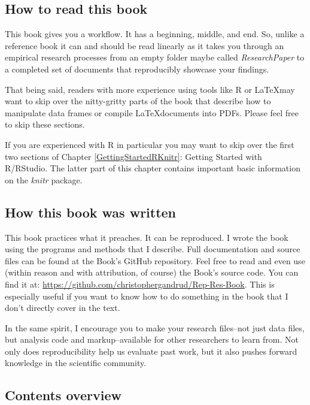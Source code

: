 \subsection{How to read this book}

This book gives you a workflow. It has a beginning, middle, and end. So, unlike a reference book it can and should be read linearly as it takes you through an empirical research processes from an empty folder maybe called {\emph{ResearchPaper}} to a completed set of documents that reproducibly showcase your findings.

That being said, readers with more experience using tools like R or \LaTeX may want to skip over the nitty-gritty parts of the book that describe how to manipulate data frames or compile \LaTeX documents into PDFs. Please feel free to skip these sections.

If you are experienced with R in particular you may want to skip over the first two sections of Chapter \ref{GettingStartedRKnitr}: Getting Started with R/RStudio. The latter part of this chapter contains important basic information on the {\emph{knitr}} package. 

\subsection{How this book was written}

This book practices what it preaches. It can be reproduced. I wrote the book using the programs and methods that I describe. Full documentation and source files can be found at the Book's GitHub repository. Feel free to read and even use (within reason and with attribution, of course) the Book's source code. You can find it at: \url{https://github.com/christophergandrud/Rep-Res-Book}. This is especially useful if you want to know how to do something in the book that I don't directly cover in the text.

In the same spirit, I encourage you to make your research files--not just data files, but analysis code and markup--available for other researchers to learn from. Not only does reproducibility help us evaluate past work, but it also pushes forward knowledge in the scientific community.

\subsection{Contents overview}

